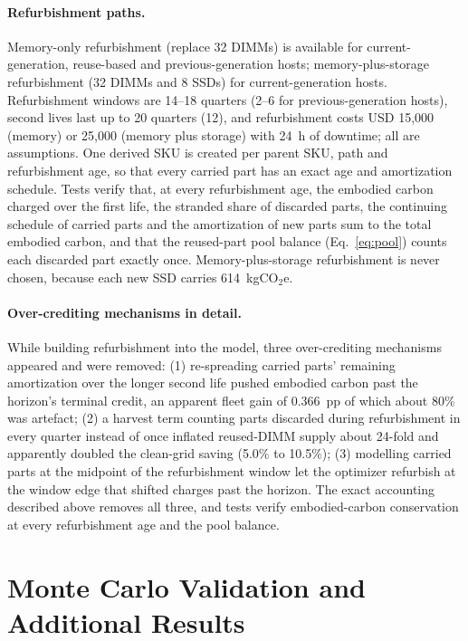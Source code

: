 \documentclass{article} %
\begin{document}
\paragraph{Refurbishment paths.} Memory-only refurbishment (replace 32 DIMMs) is available for current-generation, reuse-based and previous-generation hosts; memory-plus-storage refurbishment (32 DIMMs and 8 SSDs) for current-generation hosts. Refurbishment windows are 14--18 quarters (2--6 for previous-generation hosts), second lives last up to 20 quarters (12), and refurbishment costs USD 15,000 (memory) or 25,000 (memory plus storage) with 24~h of downtime; all are assumptions. One derived SKU is created per parent SKU, path and refurbishment age, so that every carried part has an exact age and amortization schedule. Tests verify that, at every refurbishment age, the embodied carbon charged over the first life, the stranded share of discarded parts, the continuing schedule of carried parts and the amortization of new parts sum to the total embodied carbon, and that the reused-part pool balance (Eq.~\ref{eq:pool}) counts each discarded part exactly once. Memory-plus-storage refurbishment is never chosen, because each new SSD carries 614~kgCO$_2$e.

\paragraph{Over-crediting mechanisms in detail.} While building refurbishment into the model, three over-crediting mechanisms appeared and were removed: (1) re-spreading carried parts' remaining amortization over the longer second life pushed embodied carbon past the horizon's terminal credit, an apparent fleet gain of 0.366~pp of which about 80\% was artefact; (2) a harvest term counting parts discarded during refurbishment in every quarter instead of once inflated reused-DIMM supply about 24-fold and apparently doubled the clean-grid saving (5.0\% to 10.5\%); (3) modelling carried parts at the midpoint of the refurbishment window let the optimizer refurbish at the window edge that shifted charges past the horizon. The exact accounting described above removes all three, and tests verify embodied-carbon conservation at every refurbishment age and the pool balance.

\section{Monte Carlo Validation and Additional Results}
\label{app:results}
\end{document}
